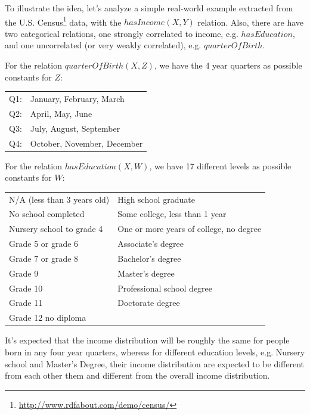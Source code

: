 To illustrate the idea, let's analyze a simple real-world example extracted from the U.S.
Census\footnote{\url{http://www.rdfabout.com/demo/census/}} data, with the $hasIncome(X,Y)$ relation. Also, there are
have two categorical relations, one strongly correlated to income, e.g. $hasEducation$, and one uncorrelated (or very
weakly correlated), e.g. $quarterOfBirth$.

For the relation $quarterOfBirth(X,Z)$, we have the 4 year quarters as possible constants for $Z$:

\begin{center}
  \begin{tabular}{r l}
    Q1:& January, February, March \\
    Q2:& April, May, June \\
    Q3:& July, August, September \\
    Q4:& October, November, December \\
  \end{tabular}
\end{center}

For the relation $hasEducation(X,W)$, we have 17 different levels as possible constants for $W$:

\begin{center}
  \begin{tabular}{l l}
    N/A (less than 3 years old) 	&High school graduate                 		\\
    No school completed			&Some college, less than 1 year			\\
    Nursery school to grade 4   	&One or more years of college, no degree	\\
    Grade 5 or grade 6          	&Associate's degree				\\
    Grade 7 or grade 8          	&Bachelor's degree				\\
    Grade 9                     	&Master's degree				\\
    Grade 10                    	&Professional school degree			\\
    Grade 11                    	&Doctorate degree				\\
    Grade 12 no diploma 		&						\\
  \end{tabular}
\end{center}

It's expected that the income distribution will be roughly the same for people born in any four year quarters, whereas
for different education levels, e.g. Nursery school and Master's Degree, their income distribution are expected to
be different from each other them and different from the overall income distribution. 

